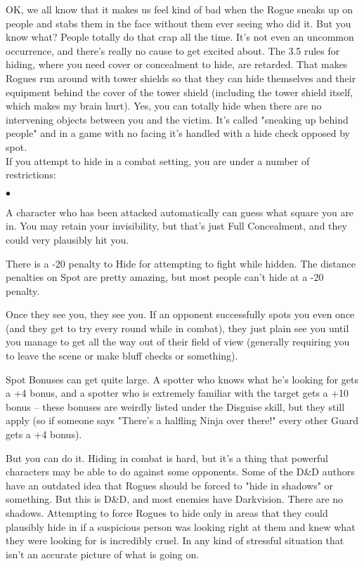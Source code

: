 OK, we all know that it makes us feel kind of bad when the Rogue sneaks up on people and stabs them in the face without them ever seeing who did it. But you know what? People totally do that crap all the time. It's not even an uncommon occurrence, and there's really no cause to get excited about. The 3.5 rules for hiding, where you need cover or concealment to hide, are retarded. That makes Rogues run around with tower shields so that they can hide themselves and their equipment behind the cover of the tower shield (including the tower shield itself, which makes my brain hurt). Yes, you can totally hide when there are no intervening objects between you and the victim. It's called "sneaking up behind people" and in a game with no facing it's handled with a hide check opposed by spot.\\

If you attempt to hide in a combat setting, you are under a number of restrictions:
\begin{list}{$\bullet$}{\itemspace}
    \item A character who has been attacked automatically can guess what square you are in. You may retain your invisibility, but that's just Full Concealment, and they could very plausibly hit you.
    \item There is a -20 penalty to Hide for attempting to fight while hidden. The distance penalties on Spot are pretty amazing, but most people can't hide at a -20 penalty.
    \item Once they see you, they see you. If an opponent successfully spots you even once (and they get to try every round while in combat), they just plain see you until you manage to get all the way out of their field of view (generally requiring you to leave the scene or make bluff checks or something).
    \item Spot Bonuses can get quite large. A spotter who knows what he's looking for gets a +4 bonus, and a spotter who is extremely familiar with the target gets a +10 bonus -- these bonuses are weirdly listed under the Disguise skill, but they still apply (so if someone says "There's a halfling Ninja over there!" every other Guard gets a +4 bonus).
\end{list}

\vspace*{8pt}

But you can do it. Hiding in combat is hard, but it's a thing that powerful characters may be able to do against some opponents. Some of the D\&D authors have an outdated idea that Rogues should be forced to "hide in shadows" or something. But this is D\&D, and most enemies have Darkvision. There are no shadows. Attempting to force Rogues to hide only in areas that they could plausibly hide in if a suspicious person was looking right at them and knew what they were looking for is incredibly cruel. In any kind of stressful situation that isn't an accurate picture of what is going on.

